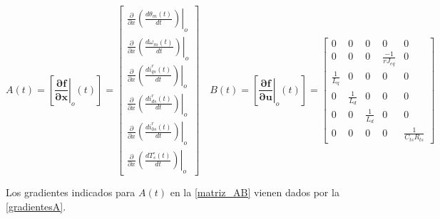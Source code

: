 \documentclass[a4paper, 10pt, onecolumn,journal]{ieeeconf}
\begin{document}
\begin{equation}
    A(t) = \left[ \left. \frac{\mathbf{\partial f}}{\mathbf{\partial x}} \right|_{o}(t) \right] =
    \begin{bmatrix}
        \left.\frac{\partial}{\partial x}\left( \frac{d \theta_m(t)}{dt}\right)\right|_{o} \\ 
        \left.\frac{\partial}{\partial x}\left( \frac{d \omega_m(t)}{dt}\right)\right|_{o} \\
        \left.\frac{\partial}{\partial x}\left( \frac{d i^r_{qs}(t)}{dt}\right)\right|_{o} \\ 
        \left.\frac{\partial}{\partial x}\left( \frac{d i^r_{ds}(t)}{dt}\right)\right|_{o} \\ 
        \left.\frac{\partial}{\partial x}\left( \frac{d i^r_{0s}(t)}{dt}\right)\right|_{o} \\ 
        \left.\frac{\partial}{\partial x}\left( \frac{d T^\circ_s(t)}{dt}\right)\right|_{o} 
    \end{bmatrix}\quad
    B(t) = \left[ \left. \frac{\mathbf{\partial f}}{\mathbf{\partial u}} \right|_{o}(t) \right] =
    \begin{bmatrix}
        0 & 0 & 0 & 0 & 0\\
        0 & 0 & 0 & \frac{-1}{r J_{eq}} & 0\\
        \frac{1}{L_q} & 0 & 0 & 0 & 0\\
        0 & \frac{1}{L_d} & 0 & 0 & 0\\
        0 & 0 & \frac{1}{L_d} & 0 & 0\\
        0 & 0 & 0 & 0 & \frac{1}{C_{ts} R_{ts}}
    \end{bmatrix}
    \label{matriz_AB}
\end{equation}

Los gradientes indicados para $A(t)$ en la \cref{matriz_AB} vienen dados por la \cref{gradientesA}.
\end{document}
